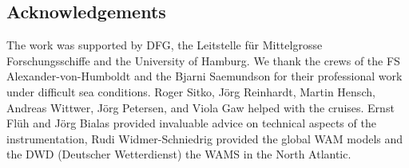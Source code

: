 \documentclass{article}
\begin{document}
{%
\subsection*{Acknowledgements}
The work was supported by DFG, the Leitstelle f\"ur Mittelgrosse
Forschungsschiffe and the University of Hamburg.  We thank the crews
of the FS Alexander-von-Humboldt and the Bjarni Saemundson for their
professional work under difficult sea conditions.  Roger Sitko, J\"org
Reinhardt, Martin Hensch, Andreas Wittwer, J\"org Petersen,
and Viola Gaw helped with the cruises.  Ernst
Fl\"uh and J\"org Bialas provided invaluable advice on technical
aspects of the instrumentation, Rudi Widmer-Schniedrig provided the
global WAM models and the DWD (Deutscher Wetterdienst) the WAMS in the North Atlantic.


}
\end{document}
